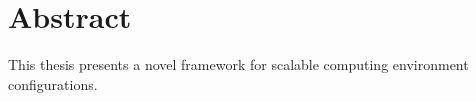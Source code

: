 \cleardoublepage
{}
\chapter*{Abstract}

This thesis presents a novel framework for scalable computing environment configurations.